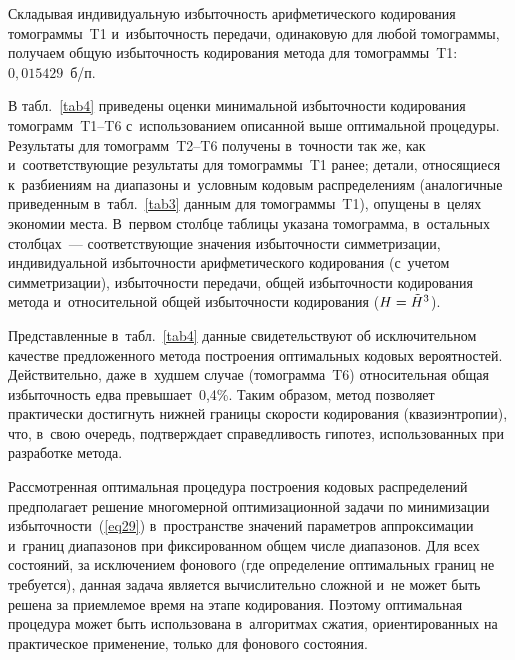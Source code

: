 \begin{multicols}{2}
Складывая индивидуальную избыточность арифметического кодирования томограммы~T1 
и~избыточность передачи, одинаковую для любой томограммы, получаем общую избыточность 
кодирования метода для томограммы~T1: $0{,}015429$~б/п.

В табл.~\ref{tab4} приведены оценки минимальной избыточности кодирования 
томограмм~T1--T6 с~использованием описанной выше оптимальной процеду\-ры. 
Результаты для томограмм~T2--T6 получены в~точности так же, как и~соответствующие 
результаты для томограммы~T1 ранее; детали, относящиеся к~разбиениям на диапазоны 
и~условным кодовым распределениям (аналогичные приведенным в~табл.~\ref{tab3} 
данным для томограммы~T1), опущены в~целях экономии места. 
В~первом столбце таблицы указана томограмма, в~остальных столбцах~--- 
соответствующие значения избыточности сим\-мет\-ри\-за\-ции, индивидуальной избыточности 
арифметического кодирования (с~учетом сим\-мет\-ри\-за\-ции), избыточности передачи, общей 
избыточности кодирования метода и~относительной общей избыточности кодирования 
($H\hm=\tilde{H}^3$).


Представленные в~табл.~\ref{tab4} данные свидетельствуют об 
исключительном качестве предложенного метода построения оптимальных 
кодовых вероятностей. Действительно, даже в~худшем случае (томограмма~T6) 
относительная общая избыточность едва превышает~0,4\%. 
Таким образом, метод позволяет практически достигнуть нижней границы ско\-рости 
кодирования (квазиэнтропии), что, в~свою очередь, подтверждает справедливость 
гипотез, использованных при разработке метода.

Рассмотренная оптимальная процедура построения кодовых распределений 
предполагает решение многомерной оптимизационной задачи по минимизации 
избыточности~(\ref{eq29}) в~пространстве значе\-ний параметров аппроксимации и~границ 
диапазонов при фиксированном общем числе диапазонов. Для всех состояний, за 
исключением фонового (где определение оптимальных границ не требуется), данная 
задача является вычислительно сложной и~не может быть решена за приемлемое время 
на этапе кодирования. Поэтому оптимальная процедура может быть использована 
в~алгоритмах сжатия, ориентированных на практическое применение, только для 
фонового состояния.

\begin{table*}[b]\small 
\vspace*{-12pt}
\begin{center}
\label{tab5}
\vspace{2ex}


\end{center}
\end{table*}
\end{multicols}
